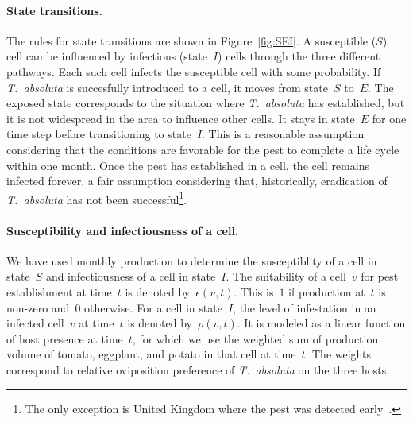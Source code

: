 \documentclass[11pt]{article}
\newcommand{\tuta}{\emph{T.~absoluta}}
\newcommand{\infest}{\rho}
\newcommand{\suitable}{\epsilon}
\theoremstyle{definition}
\begin{document}
\paragraph{State transitions.} The rules for state transitions are shown in
Figure~\ref{fig:SEI}. A susceptible ($S$) cell can be influenced by
infectious (state~$I$) cells through the three different pathways. Each
such cell infects the susceptible cell with some probability. If \tuta{} is
succesfully introduced to a cell, it moves from state~$S$ to~$E$. The
exposed state corresponds to the situation where \tuta{} has established,
but it is not widespread in the area to influence other cells. It stays in
state~$E$ for one time step before transitioning to state~$I$. This is a
reasonable assumption considering that the conditions are favorable for the
pest to complete a life cycle within one month. Once the pest has
established in a cell, the cell remains infected forever, a fair assumption
considering that, historically, eradication of \tuta{} has not been
successful\footnote{The only exception is United Kingdom where the pest was
detected early~\cite{cabiUK}.}.

\paragraph{Susceptibility and infectiousness of a cell.} We have used
monthly production to determine the susceptiblity of a cell in state~$S$
and infectiousness of a cell in state~$I$. The suitability of a cell~$v$
for pest establishment at time~$t$ is denoted by~$\suitable(v,t)$. This
is~$1$ if production at~$t$ is non-zero and~$0$ otherwise.  For a cell in
state~$I$, the level of infestation in an infected cell~$v$ at time~$t$ is
denoted by~$\infest(v,t)$. It is modeled as a linear function of host
presence at time~$t$, for which we use the weighted sum of production
volume of tomato, eggplant, and potato in that cell
at time~$t$. The weights correspond to relative oviposition preference of
\tuta{} on the three hosts.
\end{document}
